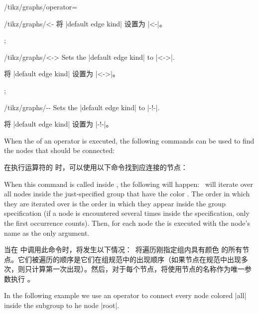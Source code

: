 \begin{key}{/tikz/graphs/operator=}
\begin{key}{/tikz/graphs/<-}
        将 |default edge kind| 设置为 |<-|。


\begin{codeexample}[preamble={\usetikzlibrary{graphs.standard}}]
\tikz {};
\end{codeexample}
    \end{key}
    \begin{key}{/tikz/graphs/<->}
        Sets the |default edge kind| to |<->|.
        
        将 |default edge kind| 设置为 |<->|。


\begin{codeexample}[preamble={\usetikzlibrary{graphs.standard}}]
\tikz {};
\end{codeexample}
    \end{key}
    \begin{key}{/tikz/graphs/-\protect\exclamationmarktext-}
        Sets the |default edge kind| to |-!-|.

        将 |default edge kind| 设置为 |-!-|。

    \end{key}

    When the  of an operator is executed, the following commands can
    be used to find the nodes that should be connected:
    
    在执行运算符的  时，可以使用以下命令找到应连接的节点：
%
    \begin{command}{\tikzgraphforeachcolorednode{}}
        When this command is called inside , the following will
        happen: \tikzname\ will iterate over all nodes inside the
        just-specified group that have the color . The order
        in which they are iterated over is the order in which they appear
        inside the group specification (if a node is encountered several times
        inside the specification, only the first occurrence counts). Then, for
        each node the  is executed with the node's name as the only
        argument.

        当在  中调用此命令时，将发生以下情况：\tikzname\ 将遍历刚指定组内具有颜色  的所有节点。它们被遍历的顺序是它们在组规范中的出现顺序（如果节点在规范中出现多次，则只计算第一次出现）。然后，对于每个节点，将使用节点的名称作为唯一参数执行 。


        In the following example we use an operator to connect every node
        colored |all| inside the subgroup to he node |root|.
        

\end{command}
\end{key}
